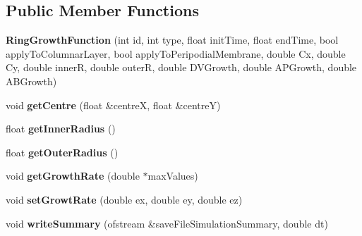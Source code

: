 \subsection*{Public Member Functions}
\begin{DoxyCompactItemize}
\item 
\hypertarget{classRingGrowthFunction_a7b8c3ed24ac7246be8817d1bcbc12289}{}{\bfseries Ring\+Growth\+Function} (int id, int type, float init\+Time, float end\+Time, bool apply\+To\+Columnar\+Layer, bool apply\+To\+Peripodial\+Membrane, double Cx, double Cy, double inner\+R, double outer\+R, double D\+V\+Growth, double A\+P\+Growth, double A\+B\+Growth)\label{classRingGrowthFunction_a7b8c3ed24ac7246be8817d1bcbc12289}

\item 
\hypertarget{classRingGrowthFunction_aa2063170e3ee5c5f22d7beef32300e9c}{}void {\bfseries get\+Centre} (float \&centre\+X, float \&centre\+Y)\label{classRingGrowthFunction_aa2063170e3ee5c5f22d7beef32300e9c}

\item 
\hypertarget{classRingGrowthFunction_ae1f4f4cecfab3ec343c748cfe78ab70b}{}float {\bfseries get\+Inner\+Radius} ()\label{classRingGrowthFunction_ae1f4f4cecfab3ec343c748cfe78ab70b}

\item 
\hypertarget{classRingGrowthFunction_ad5c890c72a8ce520411d28e929faec19}{}float {\bfseries get\+Outer\+Radius} ()\label{classRingGrowthFunction_ad5c890c72a8ce520411d28e929faec19}

\item 
\hypertarget{classRingGrowthFunction_ab3cc1858fb602ab40a74af7d0467c13b}{}void {\bfseries get\+Growth\+Rate} (double $\ast$max\+Values)\label{classRingGrowthFunction_ab3cc1858fb602ab40a74af7d0467c13b}

\item 
\hypertarget{classRingGrowthFunction_a051da280e649c81afff38a1a45cb035a}{}void {\bfseries set\+Growt\+Rate} (double ex, double ey, double ez)\label{classRingGrowthFunction_a051da280e649c81afff38a1a45cb035a}

\item 
\hypertarget{classRingGrowthFunction_a681175045cf09fadd92921e129737e65}{}void {\bfseries write\+Summary} (ofstream \&save\+File\+Simulation\+Summary, double dt)\label{classRingGrowthFunction_a681175045cf09fadd92921e129737e65}

\end{DoxyCompactItemize}
